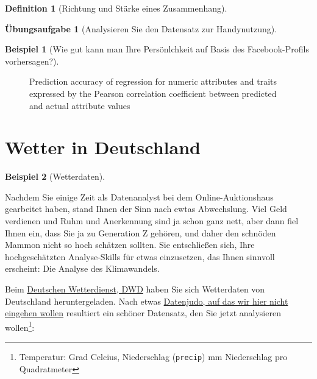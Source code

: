 \documentclass[
  a4paper,
  DIV=11]{scrreprt}
\theoremstyle{definition}
\newtheorem{exercise}{Übungsaufgabe}[chapter]
\theoremstyle{definition}
\newtheorem{example}{Beispiel}[chapter]
\theoremstyle{definition}
\newtheorem{definition}{Definition}[chapter]
\theoremstyle{remark}
\begin{document}
\begin{definition}[Richtung und Stärke eines
Zusammenhang]
\begin{exercise}[Analysieren Sie den Datensatz zur
Handynutzung]
\begin{example}[Wie gut kann man Ihre Persönlchkeit auf Basis des
Facebook-Profils
vorhersagen?]
\end{example}

\begin{figure}


\caption{\label{fig-pnas1}Prediction accuracy of regression for numeric
attributes and traits expressed by the Pearson correlation coefficient
between predicted and actual attribute values}

\end{figure}%

\section{Wetter in Deutschland}\label{wetter-in-deutschland}

\begin{example}[Wetterdaten]\protect\hypertarget{exm-wetterdaten}{}\label{exm-wetterdaten}

Nachdem Sie einige Zeit als Datenanalyst bei dem Online-Auktionshaus
gearbeitet haben, stand Ihnen der Sinn nach ewtas Abwechslung. Viel Geld
verdienen und Ruhm und Anerkennung sind ja schon ganz nett, aber dann
fiel Ihnen ein, dass Sie ja zu Generation Z gehören, und daher den
schnöden Mammon nicht so hoch schätzen sollten. Sie entschließen sich,
Ihre hochgeschätzten Analyse-Skills für etwas einzusetzen, das Ihnen
sinnvoll erscheint: Die Analyse des Klimawandels.

Beim \href{https://www.dwd.de/DE/Home/home_node.html}{Deutschen
Wetterdienst, DWD} haben Sie sich Wetterdaten von Deutschland
heruntergeladen. Nach etwas
\href{https://data-se.netlify.app/2022/07/24/preparing-german-weather-data/}{Datenjudo,
auf das wir hier nicht eingehen wollen} resultiert ein schöner
Datensatz, den Sie jetzt analysieren wollen\footnote{Temperatur: Grad
  Celcius, Niederschlag (\texttt{precip}) mm Niederschlag pro
  Quadratmeter}:


\end{example}
\end{exercise}
\end{definition}
\end{document}
